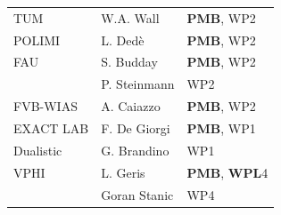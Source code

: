 \documentclass[a4paper,12pt]{article}
\begin{document}
\begin{center}
\begin{longtable}{|l|l|l|}
    \\
    TUM
    & W.A. Wall &  \textbf{PMB}, WP2
    \\
    POLIMI 
    & L. Ded\`e& \textbf{PMB}, WP2 \\
    FAU 
    & S. Budday & \textbf{PMB}, WP2 \\
    & P. Steinmann & WP2
    \\
    FVB-WIAS 
    & A. Caiazzo & \textbf{PMB}, WP2 \\
    EXACT LAB 
    & F. De Giorgi & \textbf{PMB}, WP1
    \\
    Dualistic & G. Brandino & WP1
    \\
    VPHI & L. Geris & \textbf{PMB}, \textbf{WPL}4 \\
    & Goran Stanic & WP4 \\
    \hline
    \end{longtable}
\end{center}
    
\end{document}
